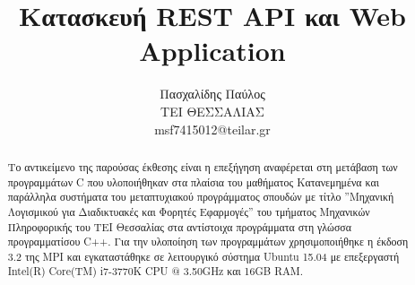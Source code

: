 \documentclass[10pt,a4paper]{article}
\title{Κατασκευή REST API και Web Application}
\author{Πασχαλίδης Παύλος\\ΤΕΙ ΘΕΣΣΑΛΙΑΣ\\msf7415012@teilar.gr}
\date{}
\begin{document}
	
	\maketitle
	\newpage	
			
	\begin{abstract}
	Το αντικείμενο της παρούσας έκθεσης είναι η επεξήγηση αναφέρεται στη μετάβαση των προγραμμάτων C που υλοποιήθηκαν στα πλαίσια του μαθήματος Κατανεμημένα και παράλληλα συστήματα του μεταπτυχιακού προγράμματος σπουδών με τίτλο ''Μηχανική Λογισμικού για Διαδικτυακές και Φορητές Εφαρμογές'' του τμήματος Μηχανικών Πληροφορικής του ΤΕΙ Θεσσαλίας στα αντίστοιχα προγράμματα στη γλώσσα προγραμματίσου C++. Για την υλοποίηση των προγραμμάτων χρησιμοποιήθηκε η έκδοση 3.2 της MPI και εγκαταστάθηκε σε λειτουργικό σύστημα Ubuntu 15.04 με επεξεργαστή Intel(R) Core(TM) i7-3770K CPU @ 3.50GHz και 16GB RAM.
	\end{abstract}

	
	

			
%	
%	
%	
	
	
%	
	
\end{document}

